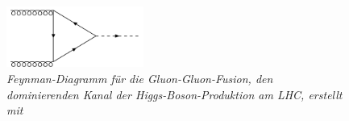 \begin{figure}[hhh]
 \begin{center}
   \includegraphics[width=0.4\textwidth]{graphics/gluonfusion.png}
   \parbox[b]{12cm}{
     \caption[Gluon-Gluon-Fusion Feynman-Diagramm]
             {\label{fig:gluonfusion} \it\!Feynman-Diagramm f\"ur die Gluon-Gluon-Fusion, den dominierenden Kanal der Higgs-Boson-Produktion am LHC, erstellt mit \cite{feynman_draw}}
   }
 \end{center}
\end{figure}